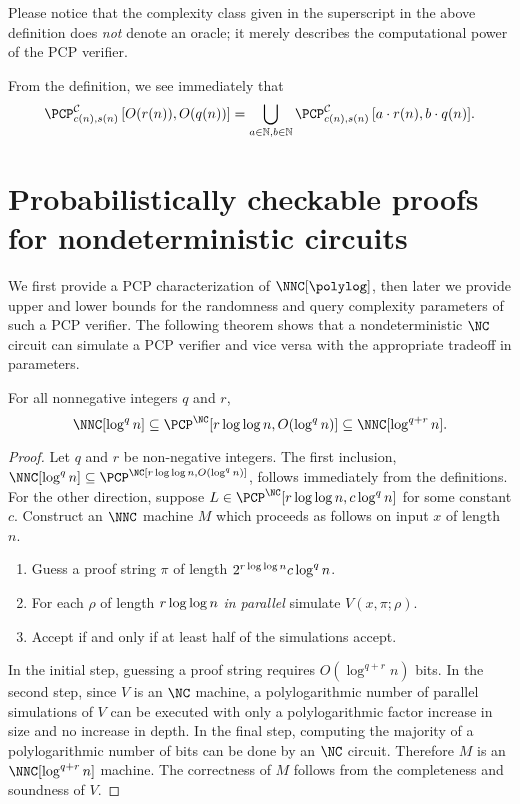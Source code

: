 Please notice that the complexity class given in the superscript in the above definition does \emph{not} denote an oracle; it merely describes the computational power of the PCP verifier.

From the definition, we see immediately that
\begin{equation*}
  \PCPcs{\mathcal{C}}{c(n)}{s(n)}{O(r(n))}{O(q(n))} = \bigcup_{a \in \mathbb{N}, b \in \mathbb{N}}{\PCPcs{\mathcal{C}}{c(n)}{s(n)}{a \cdot r(n)}{b \cdot q(n)}}.
\end{equation*}

\section{Probabilistically checkable proofs for nondeterministic circuits}

We first provide a PCP characterization of $\NNC[\polylog]$, then later we provide upper and lower bounds for the randomness and query complexity parameters of such a PCP verifier.
The following theorem shows that a nondeterministic $\NC$ circuit can simulate a PCP verifier and vice versa with the appropriate tradeoff in parameters.

\begin{theorem}\label{thm:qplusr}
  For all nonnegative integers $q$ and $r$,
  $$
    \NNC[\log^q n] \subseteq \PCP^{\NC}[r \loglog n, O(\log^q n)] \subseteq \NNC[\log^{q + r} n].
  $$
\end{theorem}
\begin{proof}
  Let $q$ and $r$ be non-negative integers.
  The first inclusion, $\NNC[\log^q n] \subseteq \PCP^\NC[r \loglog n, O(\log^q n)]$, follows immediately from the definitions.
  For the other direction, suppose $L \in \PCP^{\NC}[r \loglog n, c \log^q n]$ for some constant $c$.
  Construct an $\NNC$ machine $M$ which proceeds as follows on input $x$ of length $n$.
  \begin{enumerate}
  \item Guess a proof string $\pi$ of length $2^{r \log\log n} c \log^q n$.
  \item For each $\rho$ of length $r \log\log n$ \emph{in parallel} simulate $V(x, \pi; \rho)$.
  \item Accept if and only if at least half of the simulations accept.
  \end{enumerate}
In the initial step, guessing a proof string requires $O(\log^{q + r} n)$ bits.
In the second step, since $V$ is an $\NC$ machine, a polylogarithmic number of parallel simulations of $V$ can be executed with only a polylogarithmic factor increase in size and no increase in depth.
In the final step, computing the majority of a polylogarithmic number of bits can be done by an $\NC$ circuit.
Therefore $M$ is an $\NNC[\log^{q + r} n]$ machine.
The correctness of $M$ follows from the completeness and soundness of $V$.
\end{proof}

